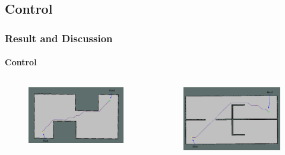 \begin{frame}
	\subsection{Control}
	\frametitle{Result and Discussion}
	\framesubtitle{Control}
	\begin{columns}
		\begin{figure}[h]
			\includegraphics[scale=0.5]{image/ct_map1.pdf}
		\end{figure}
		
		\begin{figure}[h]
			\includegraphics[scale=0.5]{image/ct_map2.pdf}
		\end{figure}
	\end{columns}
\end{frame}